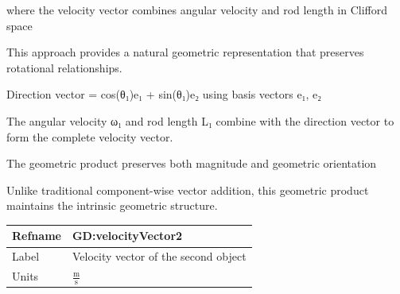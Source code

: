 \documentclass[12pt]{article}
\begin{document}
{where the velocity vector combines angular velocity and rod length in Clifford space

This approach provides a natural geometric representation that preserves rotational relationships.

Direction vector = cos(θ₁)e₁ + sin(θ₁)e₂ using basis vectors e₁, e₂

The angular velocity ω₁ and rod length L₁ combine with the direction vector to form the complete velocity vector.

The geometric product preserves both magnitude and geometric orientation

Unlike traditional component-wise vector addition, this geometric product maintains the intrinsic geometric structure.

\medskip
\noindent
\begin{minipage}{\textwidth}
\begin{tabular}{>{\raggedright}p{}>{\raggedright\arraybackslash}p{}}
\toprule \textbf{Refname} & \textbf{GD:velocityVector2}
\label{GD:velocityVector2}
\\ \midrule
Label & Velocity vector of the second object
        
\\ \midrule
Units & $\frac{\text{m}}{\text{s}}$
        

\end{tabular}
\end{minipage}}
\end{document}
